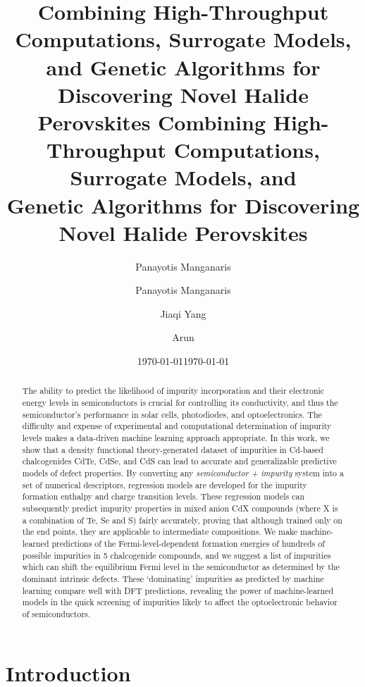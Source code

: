 \documentclass[aip, jmp, amsmath, amssymb, reprint]{revtex4-2}
\author{Panayotis Manganaris}
\date{\today}
\title{Combining High-Throughput Computations, Surrogate Models, and Genetic Algorithms for Discovering Novel Halide Perovskites}
\begin{document}
\title{%
Combining High-Throughput Computations, Surrogate Models, and\\
Genetic Algorithms for Discovering Novel Halide Perovskites
}

\author{Panayotis Manganaris}
\author{Jiaqi Yang}
\author{Arun }

\date{\today}
\begin{abstract}
The ability to predict the likelihood of impurity incorporation and their electronic energy levels in
semiconductors is crucial for controlling its conductivity, and thus the semiconductor's performance in solar
cells, photodiodes, and optoelectronics. The difficulty and expense of experimental and computational
determination of impurity levels makes a data-driven machine learning approach appropriate. In this work, we
show that a density functional theory-generated dataset of impurities in Cd-based chalcogenides CdTe, CdSe,
and CdS can lead to accurate and generalizable predictive models of defect properties. By converting any
\textit{semiconductor + impurity} system into a set of numerical descriptors, regression models are developed
for the impurity formation enthalpy and charge transition levels. These regression models can subsequently
predict impurity properties in mixed anion CdX compounds (where X is a combination of Te, Se and S) fairly
accurately, proving that although trained only on the end points, they are applicable to intermediate
compositions. We make machine-learned predictions of the Fermi-level-dependent formation energies of hundreds
of possible impurities in 5 chalcogenide compounds, and we suggest a list of impurities which can shift the
equilibrium Fermi level in the semiconductor as determined by the dominant intrinsic defects. These
`dominating' impurities as predicted by machine learning compare well with DFT predictions, revealing the
power of machine-learned models in the quick screening of impurities likely to affect the optoelectronic
behavior of semiconductors.
\end{abstract}
\section*{Introduction}
\label{sec:org7aa94ab}
\end{document}

